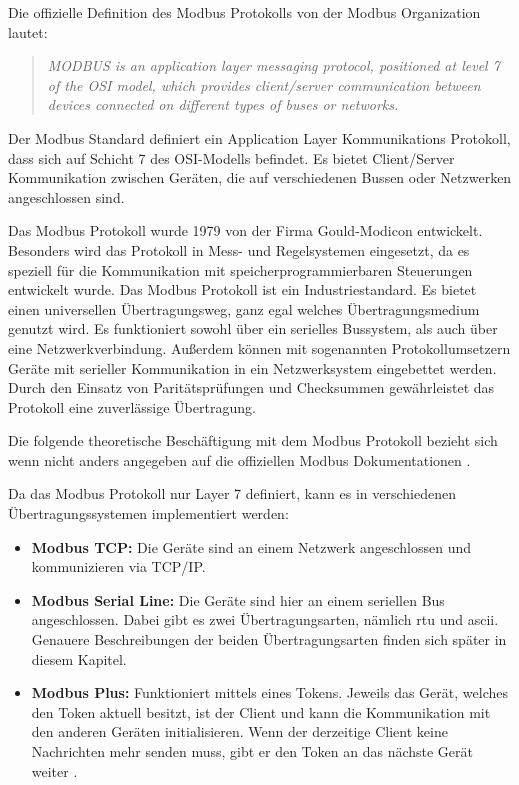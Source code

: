 Die offizielle Definition des Modbus Protokolls von der Modbus Organization \cite{Modbus_Organization_AP:2012} lautet:
\begin{quotation}
	\emph{
		MODBUS is an application layer messaging protocol, positioned at level 7 of the OSI model, which provides client/server communication between devices connected on different types of buses or networks.}
\end{quotation}

Der Modbus Standard definiert ein Application Layer Kommunikations Protokoll, dass sich auf Schicht 7 des OSI-Modells befindet. Es bietet Client/Server Kommunikation zwischen Geräten, die auf verschiedenen Bussen oder Netzwerken angeschlossen sind.

Das Modbus Protokoll wurde 1979 von der Firma Gould-Modicon entwickelt. Besonders wird das Protokoll in Mess- und Regelsystemen eingesetzt, da es speziell für die Kommunikation mit speicherprogrammierbaren Steuerungen entwickelt wurde. Das Modbus Protokoll ist ein Industriestandard. Es bietet einen universellen Übertragungsweg, ganz egal welches Übertragungsmedium genutzt wird. Es funktioniert sowohl über ein serielles Bussystem, als auch über eine Netzwerkverbindung. Außerdem können mit sogenannten Protokollumsetzern Geräte mit serieller Kommunikation in ein Netzwerksystem eingebettet werden. Durch den Einsatz von Paritätsprüfungen und Checksummen gewährleistet das Protokoll eine zuverlässige Übertragung. \cite{KUNBUS_GmbH:o.J., kvm-concepts_GmbH:2022}


Die folgende theoretische Beschäftigung mit dem Modbus Protokoll bezieht sich wenn nicht anders angegeben auf die offiziellen Modbus Dokumentationen \cite{Modbus_Organization_AP:2012, Modbus_Organization_SL:2012}. 

Da das Modbus Protokoll nur Layer 7 definiert, kann es in verschiedenen Übertragungssystemen implementiert werden:
\begin{itemize}
	\item \textbf{Modbus TCP:} Die Geräte sind an einem Netzwerk angeschlossen und kommunizieren via TCP/IP.
	\item \textbf{Modbus Serial Line:} Die Geräte sind hier an einem seriellen Bus angeschlossen. Dabei gibt es zwei Übertragungsarten, nämlich \acs{rtu} und \acs{ascii}. Genauere Beschreibungen der beiden Übertragungsarten finden sich später in diesem Kapitel.
	\item \textbf{Modbus Plus:} Funktioniert mittels eines Tokens. Jeweils das Gerät, welches den Token aktuell besitzt, ist der Client und kann die Kommunikation mit den anderen Geräten initialisieren. Wenn der derzeitige Client keine Nachrichten mehr senden muss, gibt er den Token an das nächste Gerät weiter \cite{Rinaldi:2016}.
\end{itemize}

